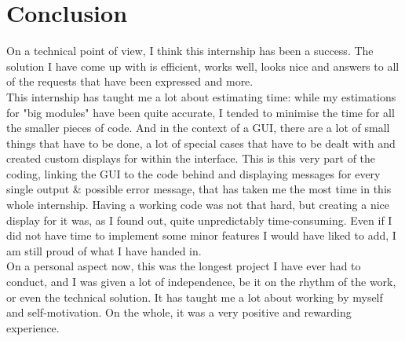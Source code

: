 \documentclass{themeensg}
\newlength\longest
\begin{document}
\newevenpage
\chapter*{Conclusion}
  
	On a technical point of view, I think this internship has been a success. The solution I have come up with is efficient, works well, looks nice and answers to all of the requests that have been expressed and more.\\
	This internship has taught me a lot about estimating time: while my estimations for "big modules" have been quite accurate, I tended to minimise the time for all the smaller pieces of code. And in the context of a GUI, there are a lot of small things that have to be done, a lot of special cases that have to be dealt with and created custom displays for within the interface. This is this very part of the coding, linking the GUI to the code behind and displaying messages for every single output \& possible error message, that has taken me the most time in this whole internship. Having a working code was not that hard, but creating a nice display for it was, as I found out, quite unpredictably time-consuming. Even if I did not have time to implement some minor features I would have liked to add, I am still proud of what I have handed in.\\
	
	On a personal aspect now, this was the longest project I have ever had to conduct, and I was given a lot of independence, be it on the rhythm of the work, or even the technical solution. It has taught me a lot about working by myself and self-motivation. On the whole, it was a very positive and rewarding experience.
	  
  \vspace{1.5cm}
\end{document}
